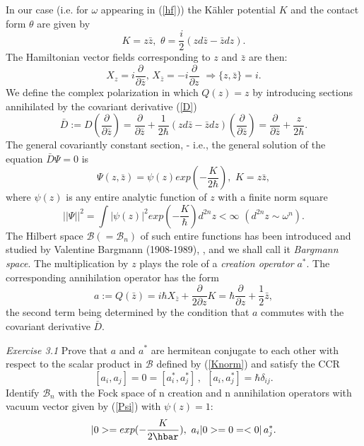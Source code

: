 \documentclass[12pt]{article}
\begin{document}
In our case (i.e. for $\omega$ appearing in (\ref{hf})) the K\"ahler potential $K$ and the contact form $\theta$ are given by
\begin{equation}
\label{Ktheta}
K = z \bar z, \, \, \theta = \frac{i}{2}(zd\bar z - \bar z dz).
\end{equation}
The Hamiltonian vector fields corresponding to $z$ and $\bar{z}$ are then:
\begin{equation}
\label{z/bar}
X_z=i\frac{\partial}{\partial{\bar z}}, \, X_{\bar z}=
-i\frac{\partial}{\partial z} \, \, \Rightarrow \{z,\bar z\} = i.
\end{equation} 
We define the complex polarization in which $Q(z) = z$ by introducing sections annihilated by the covariant derivative (\ref{D})
\begin{equation}
\label{Dbar}
\bar D:= D(\frac{\partial}{\partial{\bar z}}) = 
\frac{\partial}{\partial{\bar z}} + \frac{1}{2\hbar}(zd\bar z - \bar z dz) 
(\frac{\partial}{\partial{\bar z}} ) = \frac{\partial}{\partial{\bar z}}  + 
\frac{z}{2\hbar}. 
\end{equation}
The general covariantly constant section, - i.e., the general solution of
the equation  $\bar D \Psi = 0$ is
\begin{equation}
\label{Psi}
\Psi (z, \bar z) = \psi(z) exp(-\frac{K}{2\hbar}), \, \, K=z\bar z,  
\end{equation}
 where $\psi(z)$ is any entire analytic function of $z$ with a finite 
norm square
\begin{equation}
\label{Knorm}
||\Psi||^2 = \int |\psi(z)|^2 exp(-\frac{K}{\hbar})d^{2n}z < \infty \, \,
(d^{2n}z \sim \omega^n). 
\end{equation}
The Hilbert space ${\mathcal B}(= {\mathcal B}_n)$ of such entire functions 
has been introduced and studied by Valentine Bargmann (1908-1989), \cite{B61}, 
and we shall call it {\it Bargmann space}. The multiplication by $z$ plays 
the role of a {\it creation operator} $a^*$. The corresponding annihilation operator has the form 
\begin{equation}
\label{a}
a:=Q(\bar z)= i\hbar X_{\bar z} + \frac{\partial}{2 \partial z} K = 
\hbar\frac{\partial}{\partial z} + \frac{1}{2}\bar z,
\end{equation}
the second term being determined by the condition that $a$ commutes with the covariant derivative $\bar D$.

{\it Exercise 3.1} Prove that $a$ and $a^*$ are hermitean conjugate to each other with respect to the scalar product in ${\mathcal B}$ defined by (\ref{Knorm}) and satisfy the CCR
\begin{equation}
\label{aa*}
[a_i, a_j] =0 = [a^*_i, a^*_j] \,, \ \ [a_i, a^*_j] = \hbar\delta_{ij}.
\end{equation}
Identify ${\mathcal B}_n$ with the Fock space of n creation and n annihilation 
operators with vacuum vector given by (\ref{Psi}) with $\psi(z) = 1$:
\begin{equation}
\label{vac}
\vac = exp(-\frac{K}{2\hbar}), \, \, a_i\vac = 0 = <0|\, a_j^*.
\end{equation} 
\end{document}
